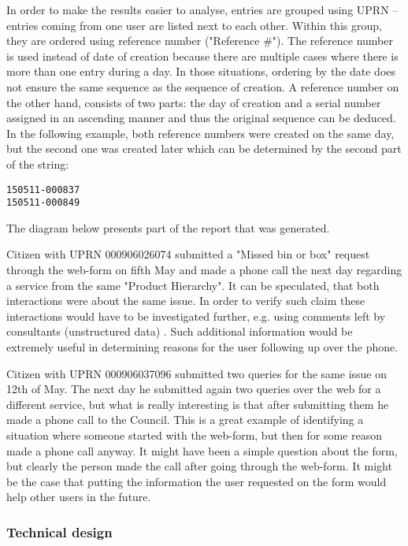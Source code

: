 In order to make the results easier to analyse, entries are grouped using UPRN – entries coming from one user are listed next to each other. Within this group, they are ordered using reference number ("Reference \#"). The reference number is used instead of date of creation because there are multiple cases where there is more than one entry during a day. In those situations, ordering by the date does not ensure the same sequence as the sequence of creation. A reference number on the other hand, consists of two parts: the day of creation and a serial number assigned in an ascending manner and thus the original sequence can be deduced. In the following example, both reference numbers were created on the same day, but the second one was created later which can be determined by the second part of the string:
\begin{lstlisting}
150511-000837
150511-000849
\end{lstlisting}

The diagram below presents part of the report that was generated.

Citizen with UPRN 000906026074 submitted a "Missed bin or box" request through the web-form on fifth May and made a phone call the next day regarding a service from the same "Product Hierarchy". It can be speculated, that both interactions were about the same issue. In order to verify such claim these interactions would have to be investigated further, e.g. using comments left by consultants (unstructured data) \citep{baars2008management}. Such additional information would be extremely useful in determining reasons for the user following up over the phone.

Citizen with UPRN 000906037096 submitted two queries for the same issue on 12th of May. The next day he submitted again two queries over the web for a different service, but what is really interesting is that after submitting them he made a phone call to the Council. This is a great example of identifying a situation where someone started with the web-form, but then for some reason made a phone call anyway. It might have been a simple question about the form, but clearly the person made the call after going through the web-form. It might be the case that putting the information the user requested on the form would help other users in the future.
		
			\subsubsection{Technical design}
			
